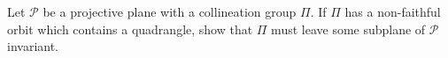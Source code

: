 Let $\mathcal{P}$ be a projective plane with a collineation group $\Pi$. If $\Pi$ has a non-faithful orbit which contains a quadrangle, show that $\Pi$ must leave some subplane of $\mathcal{P}$ invariant.
